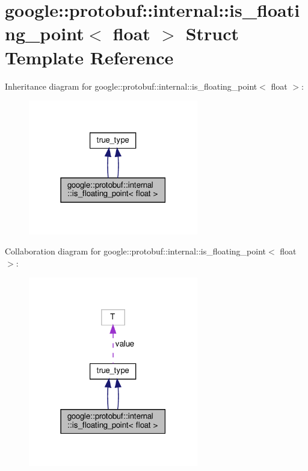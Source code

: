 \hypertarget{structgoogle_1_1protobuf_1_1internal_1_1is__floating__point_3_01float_01_4}{}\section{google\+:\+:protobuf\+:\+:internal\+:\+:is\+\_\+floating\+\_\+point$<$ float $>$ Struct Template Reference}
\label{structgoogle_1_1protobuf_1_1internal_1_1is__floating__point_3_01float_01_4}


Inheritance diagram for google\+:\+:protobuf\+:\+:internal\+:\+:is\+\_\+floating\+\_\+point$<$ float $>$\+:
\nopagebreak
\begin{figure}[H]
\begin{center}
\leavevmode
\includegraphics[width=210pt]{structgoogle_1_1protobuf_1_1internal_1_1is__floating__point_3_01float_01_4__inherit__graph}
\end{center}
\end{figure}


Collaboration diagram for google\+:\+:protobuf\+:\+:internal\+:\+:is\+\_\+floating\+\_\+point$<$ float $>$\+:
\nopagebreak
\begin{figure}[H]
\begin{center}
\leavevmode
\includegraphics[width=210pt]{structgoogle_1_1protobuf_1_1internal_1_1is__floating__point_3_01float_01_4__coll__graph}
\end{center}
\end{figure}
